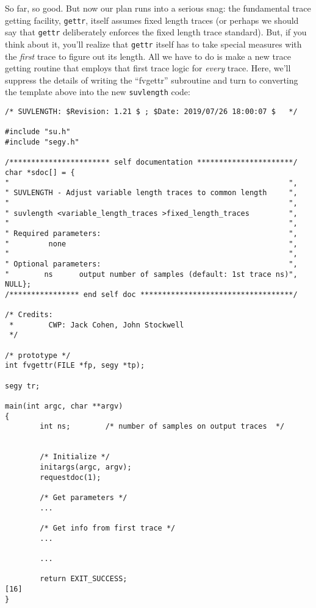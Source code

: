 {{{{{{{So far, so good.  But now our plan runs into a serious snag: the
fundamental trace getting facility, {\tt gettr}, itself assumes fixed
length traces (or perhaps we should say that {\tt gettr} deliberately
enforces the fixed length trace standard).  But, if you think about
it, you'll realize that {\tt gettr} itself has to take special measures
with the {\em first} trace to figure out its length.  All we have to do
is make a new trace getting routine that employs that first trace
logic for {\em every} trace.  Here, we'll suppress the details of
writing the ``fvgettr'' subroutine and turn to converting the
template above into the new {\tt suvlength} code:

{\small\begin{verbatim}
/* SUVLENGTH: $Revision: 1.21 $ ; $Date: 2019/07/26 18:00:07 $   */

#include "su.h"
#include "segy.h"

/*********************** self documentation **********************/
char *sdoc[] = {
"                                                                ",
" SUVLENGTH - Adjust variable length traces to common length     ",
"                                                                ",
" suvlength <variable_length_traces >fixed_length_traces         ",
"                                                                ",
" Required parameters:                                           ",
"         none                                                   ",
"                                                                ",
" Optional parameters:                                           ",
"        ns      output number of samples (default: 1st trace ns)",
NULL};
/**************** end self doc ***********************************/

/* Credits:
 *        CWP: Jack Cohen, John Stockwell
 */

/* prototype */
int fvgettr(FILE *fp, segy *tp);

segy tr;

main(int argc, char **argv)
{
        int ns;        /* number of samples on output traces  */


        /* Initialize */                 
        initargs(argc, argv);
        requestdoc(1);
 
        /* Get parameters */
        ...
        
        /* Get info from first trace */
        ...

        ...

        return EXIT_SUCCESS;                                          [16]
}


\end{verbatim}}}}}}}}}
